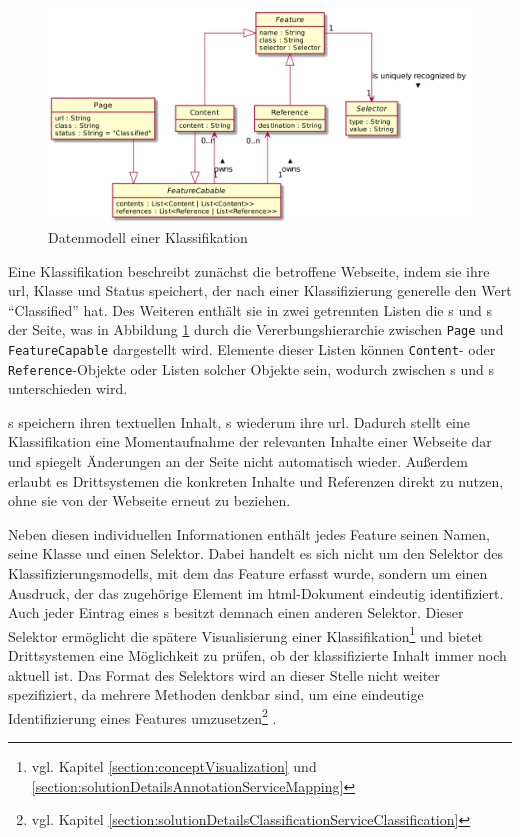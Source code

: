         \begin{figure}[htb]
            \centering
            \includegraphics[scale=\imageScalingFactor]{../resources/concept/page.png}
            \caption{Datenmodell einer Klassifikation}
            \label{image:conceptPageDataModel}
        \end{figure}

        Eine Klassifikation beschreibt zunächst die betroffene Webseite,
        indem sie ihre \gls{url}, Klasse und Status speichert,
        der nach einer Klassifizierung generelle den Wert "`Classified"' hat.       
        Des Weiteren enthält sie in zwei getrennten Listen die {\contentFeature}s
        und {}s der Seite, was in Abbildung \ref{image:conceptPageDataModel}
        durch die Vererbungshierarchie zwischen \texttt{Page} und \texttt{FeatureCapable}
        dargestellt wird.
        Elemente dieser Listen können \texttt{Content}- oder \texttt{Reference}-Objekte
        oder Listen solcher Objekte sein,
        wodurch zwischen {\scalarFeature}s und {\collectionFeature}s unterschieden wird.

        {\contentFeature}s speichern ihren textuellen Inhalt,
        {}s wiederum ihre \gls{url}.
        Dadurch stellt eine Klassifikation eine Momentaufnahme der relevanten Inhalte
        einer Webseite dar und spiegelt Änderungen an der Seite nicht
        automatisch wieder.
        Außerdem erlaubt es Drittsystemen die konkreten Inhalte und Referenzen
        direkt zu nutzen, ohne sie von der Webseite erneut zu beziehen.
        
        Neben diesen individuellen Informationen enthält jedes Feature
        seinen Namen, seine Klasse und einen Selektor.
        Dabei handelt es sich nicht um den Selektor des Klassifizierungsmodells,
        mit dem das Feature erfasst wurde,
        sondern um einen Ausdruck, der das zugehörige Element im \gls{html}-Dokument eindeutig identifiziert.
        Auch jeder Eintrag eines {\collectionFeature}s besitzt demnach einen anderen Selektor.
        Dieser Selektor ermöglicht die spätere Visualisierung einer
        Klassifikation\footnote{vgl. Kapitel \ref{section:conceptVisualization} und
        \ref{section:solutionDetailsAnnotationServiceMapping}}
        und bietet Drittsystemen eine Möglichkeit zu prüfen,
        ob der klassifizierte Inhalt immer noch aktuell ist.
        Das Format des Selektors wird an dieser Stelle nicht weiter spezifiziert,
        da mehrere Methoden denkbar sind, um eine eindeutige Identifizierung eines Features
        umzusetzen\footnote{vgl. Kapitel \ref{section:solutionDetailsClassificationServiceClassification}} .
